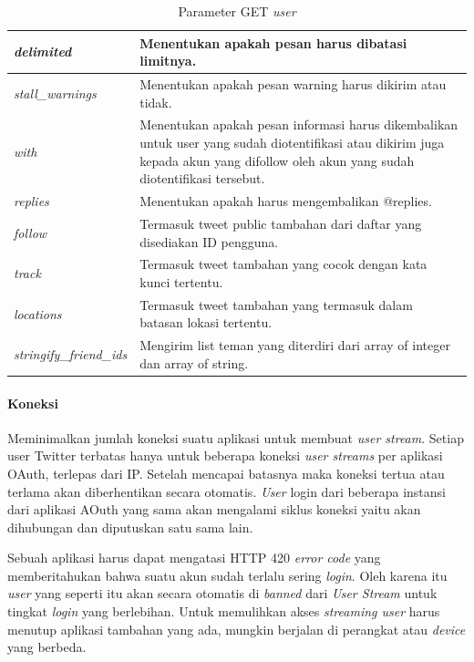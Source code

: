 \begin{table}[h]
\begin{tabular}{|p{5cm}|p{9cm}|}
\hline
\textit{delimited}              & Menentukan apakah pesan harus dibatasi limitnya.																												\\ \hline
\textit{stall\_warnings}        & Menentukan apakah pesan warning harus dikirim atau tidak.                                                               \\ \hline
\textit{with}                   & Menentukan apakah pesan informasi harus dikembalikan untuk user yang sudah diotentifikasi atau dikirim juga kepada akun yang difollow oleh akun yang sudah diotentifikasi tersebut.\\ \hline
\textit{replies}                & Menentukan apakah harus mengembalikan @replies.                                                                             \\ \hline
\textit{follow}                 & Termasuk tweet public tambahan dari daftar yang disediakan ID pengguna.														\\ \hline
\textit{track}                  & Termasuk tweet tambahan yang cocok dengan kata kunci tertentu.     \\ \hline
\textit{locations}              & Termasuk tweet tambahan yang termasuk dalam batasan lokasi tertentu.                                                      \\ \hline
\textit{stringify\_friend\_ids} & Mengirim list teman yang diterdiri dari array of integer dan array of string.              \\ \hline            
\end{tabular}
\caption{Parameter GET \textit{user}}
\label{table:ParameterGetUser}
\end{table}

\paragraph{Koneksi}
Meminimalkan jumlah koneksi suatu aplikasi untuk membuat \textit{user stream}. Setiap user Twitter terbatas hanya untuk beberapa koneksi \textit{user streams} per aplikasi OAuth, terlepas dari IP. Setelah mencapai batasnya maka koneksi tertua atau terlama akan diberhentikan secara otomatis. \textit{User} login dari beberapa instansi dari aplikasi AOuth yang sama akan mengalami siklus koneksi yaitu akan dihubungan dan diputuskan satu sama lain.

Sebuah aplikasi harus dapat mengatasi HTTP 420 \textit{error code} yang memberitahukan bahwa suatu akun sudah terlalu sering \textit{login}. Oleh karena itu \textit{user} yang seperti itu akan secara otomatis di \textit{banned} dari \textit{User Stream} untuk tingkat \textit{login} yang berlebihan. Untuk memulihkan akses \textit{streaming user} harus menutup aplikasi tambahan yang ada, mungkin berjalan di perangkat atau \textit{device} yang berbeda.

